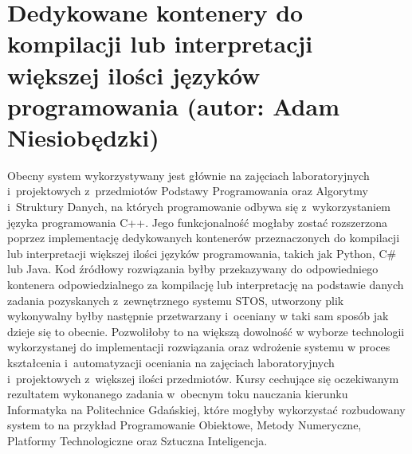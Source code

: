 \section{Dedykowane kontenery do kompilacji lub interpretacji większej ilości języków programowania (autor: Adam Niesiobędzki)}
Obecny system wykorzystywany jest głównie na zajęciach laboratoryjnych i~projektowych z~przedmiotów Podstawy Programowania oraz Algorytmy i~Struktury Danych, na których programowanie odbywa się z~wykorzystaniem języka programowania C++. Jego funkcjonalność mogłaby zostać rozszerzona poprzez implementację dedykowanych kontenerów przeznaczonych do kompilacji lub interpretacji większej ilości języków programowania, takich jak Python, C\# lub Java. Kod źródłowy rozwiązania byłby przekazywany do odpowiedniego kontenera odpowiedzialnego za kompilację lub interpretację na podstawie danych zadania pozyskanych z~zewnętrznego systemu STOS, utworzony plik wykonywalny byłby następnie przetwarzany i~oceniany w taki sam sposób jak dzieje się to obecnie. Pozwoliłoby to na większą dowolność w wyborze technologii wykorzystanej do implementacji rozwiązania oraz wdrożenie systemu w proces kształcenia i~automatyzacji oceniania na zajęciach laboratoryjnych i~projektowych z~większej ilości przedmiotów. Kursy cechujące się oczekiwanym rezultatem wykonanego zadania w~obecnym toku nauczania kierunku Informatyka na Politechnice Gdańskiej, które mogłyby wykorzystać rozbudowany system to na przykład Programowanie Obiektowe, Metody Numeryczne, Platformy Technologiczne oraz Sztuczna Inteligencja.